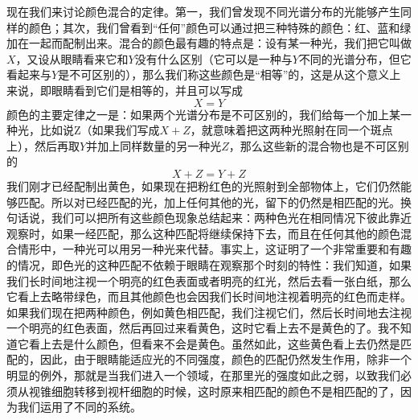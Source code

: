 现在我们来讨论颜色混合的定律。第一，我们曾发现不同光谱分布的光能够产生同样的颜色；其次，我们曾看到“任何”颜色可以通过把三种特殊的颜色：红、蓝和绿加在一起而配制出来。混合的颜色最有趣的特点是：设有某一种光，我们把它叫做$X$，又设从眼睛看来它和$Y$没有什么区别（它可以是一种与$Y$不同的光谱分布，但它看起来与$Y$是不可区别的），那么我们称这些颜色是“相等”的，这是从这个意义上来说，即眼睛看到它们是相等的，并且可以写成
\begin{equation}
    \label{Eq:I:35:2}
    X = Y
\end{equation}
颜色的主要定律之一是：如果两个光谱分布是不可区别的，我们给每一个加上某一种光，比如说Z（如果我们写成$X+Z$，就意味着把这两种光照射在同一个斑点上），然后再取$Y$并加上同样数量的另一种光$Z$，那么这些新的混合物也是不可区别的
\begin{equation}
    \label{Eq:I:35:3}
    X + Z = Y + Z
\end{equation}
我们刚才已经配制出黄色，如果现在把粉红色的光照射到全部物体上，它们仍然能够匹配。所以对已经匹配的光，加上任何其他的光，留下的仍然是相匹配的光。换句话说，我们可以把所有这些颜色现象总结起来：两种色光在相同情况下彼此靠近观察时，如果一经匹配，那么这种匹配将继续保持下去，而且在任何其他的颜色混合情形中，一种光可以用另一种光来代替。事实上，这证明了一个非常重要和有趣的情况，即色光的这种匹配不依赖于眼睛在观察那个时刻的特性：我们知道，如果我们长时间地注视一个明亮的红色表面或者明亮的红光，然后去看一张白纸，那么它看上去略带绿色，而且其他颜色也会因我们长时间地注视着明亮的红色而走样。如果我们现在把两种颜色，例如黄色相匹配，我们注视它们，然后长时间地去注视一个明亮的红色表面，然后再回过来看黄色，这时它看上去不是黄色的了。我不知道它看上去是什么颜色，但看来不会是黄色。虽然如此，这些黄色看上去仍然是匹配的，因此，由于眼睛能适应光的不同强度，颜色的匹配仍然发生作用，除非一个明显的例外，那就是当我们进入一个领域，在那里光的强度如此之弱，以致我们必须从视锥细胞转移到视杆细胞的时候，这时原来相匹配的颜色不是相匹配的了，因为我们运用了不同的系统。

